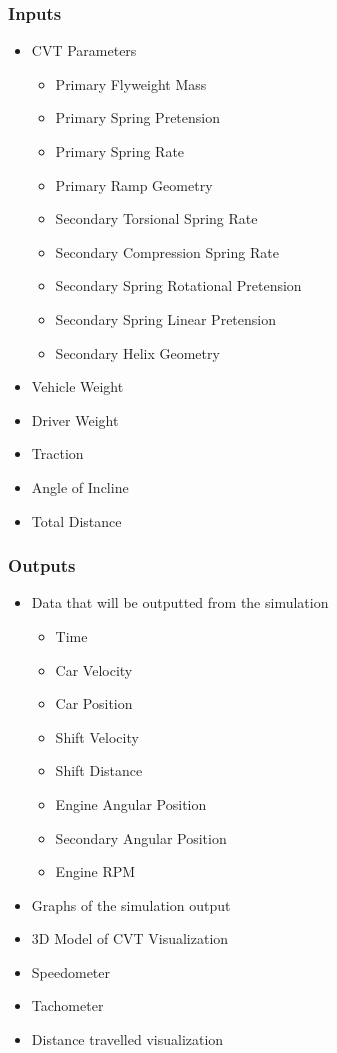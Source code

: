 \documentclass{article}
\begin{document}
\subsubsection{Inputs}
\begin{itemize}
    \item CVT Parameters
    \begin{itemize}
        \item Primary Flyweight Mass
        \item Primary Spring Pretension
        \item Primary Spring Rate
        \item Primary Ramp Geometry
        \item Secondary Torsional Spring Rate
        \item Secondary Compression Spring Rate
        \item Secondary Spring Rotational Pretension
        \item Secondary Spring Linear Pretension
        \item Secondary Helix Geometry
    \end{itemize}
    \item Vehicle Weight
    \item Driver Weight
    \item Traction
    \item Angle of Incline
    \item Total Distance
\end{itemize}
\subsubsection{Outputs}
\begin{itemize}
    \item Data that will be outputted from the simulation
    \begin{itemize}
        \item Time
        \item Car Velocity
        \item Car Position
        \item Shift Velocity
        \item Shift Distance
        \item Engine Angular Position
        \item Secondary Angular Position
        \item Engine RPM
    \end{itemize}
    \item Graphs of the simulation output
    \item 3D Model of CVT Visualization
    \item Speedometer
    \item Tachometer
    \item Distance travelled visualization
\end{itemize}
\end{document}
